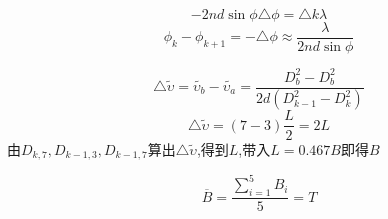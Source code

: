 \documentclass[UTF8]{article}
\begin{document}
{	$$-2nd\sin\phi\triangle\phi = \triangle k\lambda$$
	$$\phi_k - \phi_{k+1} = -\triangle\phi \approx\frac{\lambda}{2nd\sin\phi}$$
	
	$$\triangle \tilde{\upsilon} = \widetilde{\upsilon_b} - \widetilde{\upsilon_a} = \frac{D_b^2 - D_b^2}{2d(D_{k-1}^2 - D_k^2)}$$
	$$\triangle \tilde{\upsilon} = (7-3)\frac{L}{2} = 2L$$
	由$D_{k,7}, D_{k-1,3}, D_{k-1,7}$算出$\triangle \tilde{\upsilon}$,得到$L$,带入$L = 0.467B$即得$B$
	
	$$\overline{B} = \frac{\sum_{i=1}^{5}B_i}{5} = T$$
	
}
\end{document}
